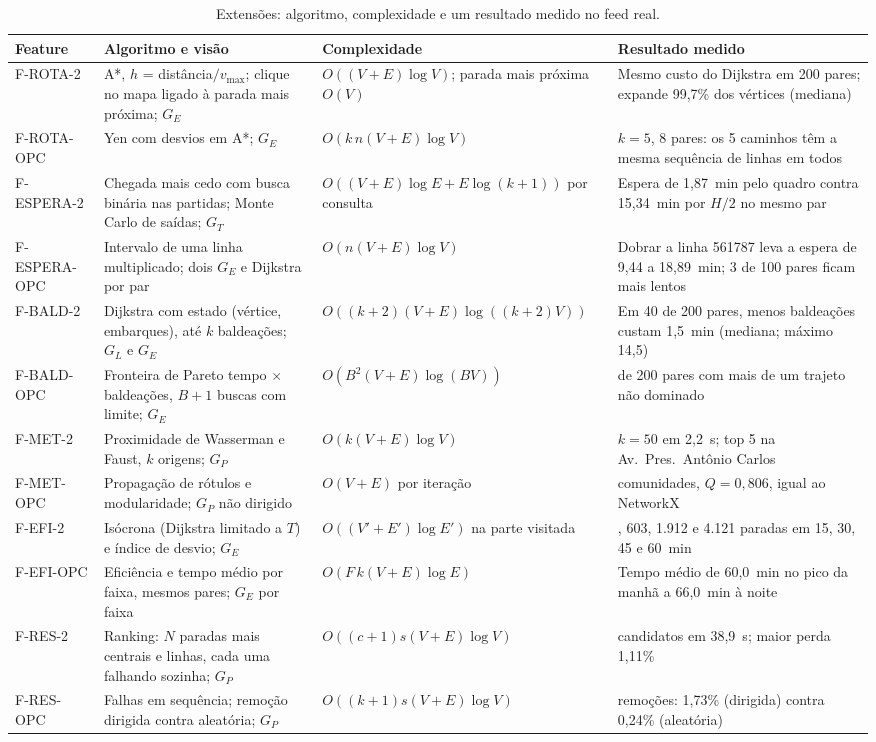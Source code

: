 \begin{table}[t]
\centering
\caption{Extensões: algoritmo, complexidade e um resultado medido no feed real.}
\label{tab:extensoes}
\scriptsize
\setlength{\tabcolsep}{3pt}
\begin{tabularx}{\textwidth}{@{}l>{\raggedright\arraybackslash}p{3.6cm}%
  >{\raggedright\arraybackslash}p{3.1cm}>{\raggedright\arraybackslash}X@{}}
\toprule
Feature & Algoritmo e visão & Complexidade & Resultado medido \\
\midrule
F-ROTA-2 & A*, $h$ = distância$/v_{\max}$; clique no mapa ligado à parada mais próxima;
  $G_E$ & $O((V + E)\log V)$; parada mais próxima $O(V)$ & Mesmo custo do Dijkstra em 200
  pares; expande 99,7\% dos vértices (mediana) \\
F-ROTA-OPC & Yen com desvios em A*; $G_E$ & $O(k\,n(V + E)\log V)$ & $k = 5$, 8 pares: os 5
  caminhos têm a mesma sequência de linhas em todos \\
F-ESPERA-2 & Chegada mais cedo com busca binária nas partidas; Monte Carlo de saídas; $G_T$ &
  $O((V + E)\log E + E\log(k + 1))$ por consulta & Espera de 1,87~min pelo quadro contra
  15,34~min por $H/2$ no mesmo par \\
F-ESPERA-OPC & Intervalo de uma linha multiplicado; dois $G_E$ e Dijkstra por par &
  $O(n(V + E)\log V)$ & Dobrar a linha 561787 leva a espera de 9,44 a 18,89~min; 3 de 100
  pares ficam mais lentos \\
F-BALD-2 & Dijkstra com estado (vértice, embarques), até $k$ baldeações; $G_L$ e $G_E$ &
  $O((k + 2)(V + E)\log((k + 2)V))$ & Em 40 de 200 pares, menos baldeações custam 1,5~min
  (mediana; máximo 14,5) \\
F-BALD-OPC & Fronteira de Pareto tempo $\times$ baldeações, $B + 1$ buscas com limite; $G_E$ &
  $O(B^2(V + E)\log(BV))$ & 170 de 200 pares com mais de um trajeto não dominado \\
F-MET-2 & Proximidade de Wasserman e Faust, $k$ origens; $G_P$ & $O(k(V + E)\log V)$ &
  $k = 50$ em 2,2~s; top 5 na Av.\ Pres.\ Antônio Carlos \\
F-MET-OPC & Propagação de rótulos e modularidade; $G_P$ não dirigido & $O(V + E)$ por
  iteração & 604 comunidades, $Q = 0{,}806$, igual ao NetworkX \\
F-EFI-2 & Isócrona (Dijkstra limitado a $T$) e índice de desvio; $G_E$ &
  $O((V' + E')\log E')$ na parte visitada & 68, 603, 1.912 e 4.121 paradas em 15, 30, 45 e
  60~min \\
F-EFI-OPC & Eficiência e tempo médio por faixa, mesmos pares; $G_E$ por faixa &
  $O(F\,k(V + E)\log E)$ & Tempo médio de 60,0~min no pico da manhã a 66,0~min à noite \\
F-RES-2 & Ranking: $N$ paradas mais centrais e linhas, cada uma falhando sozinha; $G_P$ &
  $O((c + 1)s(V + E)\log V)$ & 30 candidatos em 38,9~s; maior perda 1,11\% \\
F-RES-OPC & Falhas em sequência; remoção dirigida contra aleatória; $G_P$ &
  $O((k + 1)s(V + E)\log V)$ & 10 remoções: 1,73\% (dirigida) contra 0,24\% (aleatória) \\
\bottomrule
\end{tabularx}
\end{table}

